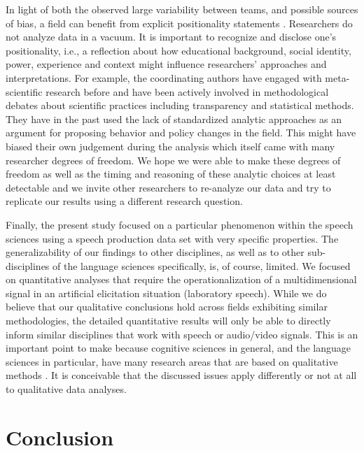 \documentclass[Review,times,sageh]{sagej}
\begin{document}
In light of both the observed large variability between teams, and possible sources of bias, a field can benefit from explicit positionality statements \citep[e.g.,][]{jafar2018, darwin2020, fox2021open}.
Researchers do not analyze data in a vacuum.
It is important to recognize and disclose one's positionality, i.e., a reflection about how educational background, social identity, power, experience and context might influence researchers' approaches and interpretations.
For example, the coordinating authors have engaged with meta-scientific research before and have been actively involved in methodological debates about scientific practices including transparency and statistical methods.
They have in the past used the lack of standardized analytic approaches as an argument for proposing behavior and policy changes in the field.
This might have biased their own judgement during the analysis which itself came with many researcher degrees of freedom.
We hope we were able to make these degrees of freedom as well as the timing and reasoning of these analytic choices at least detectable and we invite other researchers to re-analyze our data and try to replicate our results using a different research question.

Finally, the present study focused on a particular phenomenon within the speech sciences using a speech production data set with very specific properties.
The generalizability of our findings to other disciplines, as well as to other sub-disciplines of the language sciences specifically, is, of course, limited.
We focused on quantitative analyses that require the operationalization of a multidimensional signal in an artificial elicitation situation (laboratory speech).
While we do believe that our qualitative conclusions hold across fields exhibiting similar methodologies, the detailed quantitative results will only be able to directly inform similar disciplines that work with speech or audio/video signals.
This is an important point to make because cognitive sciences in general, and the language sciences in particular, have many research areas that are based on qualitative methods \citep{haven2019}.
It is conceivable that the discussed issues apply differently or not at all to qualitative data analyses.

\hypertarget{conclusion}{%
\section{Conclusion}\label{conclusion}}
\end{document}
